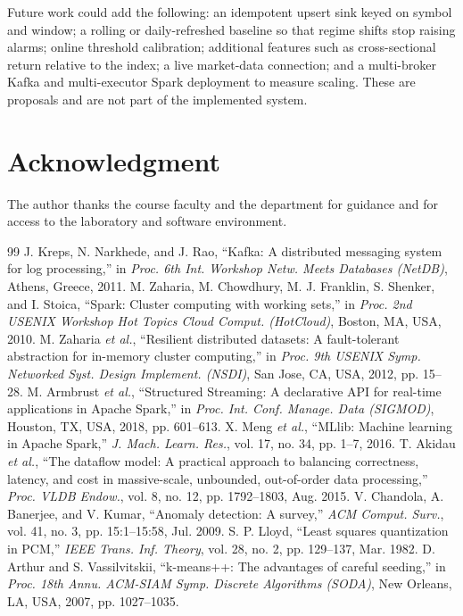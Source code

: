 \documentclass[conference]{IEEEtran}
\begin{document}
Future work could add the following: an idempotent upsert sink keyed on symbol and window; a rolling or daily-refreshed baseline so that regime shifts stop raising alarms; online threshold calibration; additional features such as cross-sectional return relative to the index; a live market-data connection; and a multi-broker Kafka and multi-executor Spark deployment to measure scaling. These are proposals and are not part of the implemented system.

\section*{Acknowledgment}
The author thanks the course faculty and the department for guidance and for access to the laboratory and software environment.

\begin{thebibliography}{99}
 J. Kreps, N. Narkhede, and J. Rao, ``Kafka: A distributed messaging system for log processing,'' in \emph{Proc. 6th Int. Workshop Netw. Meets Databases (NetDB)}, Athens, Greece, 2011.
 M. Zaharia, M. Chowdhury, M. J. Franklin, S. Shenker, and I. Stoica, ``Spark: Cluster computing with working sets,'' in \emph{Proc. 2nd USENIX Workshop Hot Topics Cloud Comput. (HotCloud)}, Boston, MA, USA, 2010.
 M. Zaharia \emph{et al.}, ``Resilient distributed datasets: A fault-tolerant abstraction for in-memory cluster computing,'' in \emph{Proc. 9th USENIX Symp. Networked Syst. Design Implement. (NSDI)}, San Jose, CA, USA, 2012, pp. 15--28.
 M. Armbrust \emph{et al.}, ``Structured Streaming: A declarative API for real-time applications in Apache Spark,'' in \emph{Proc. Int. Conf. Manage. Data (SIGMOD)}, Houston, TX, USA, 2018, pp. 601--613.
 X. Meng \emph{et al.}, ``MLlib: Machine learning in Apache Spark,'' \emph{J. Mach. Learn. Res.}, vol. 17, no. 34, pp. 1--7, 2016.
 T. Akidau \emph{et al.}, ``The dataflow model: A practical approach to balancing correctness, latency, and cost in massive-scale, unbounded, out-of-order data processing,'' \emph{Proc. VLDB Endow.}, vol. 8, no. 12, pp. 1792--1803, Aug. 2015.
 V. Chandola, A. Banerjee, and V. Kumar, ``Anomaly detection: A survey,'' \emph{ACM Comput. Surv.}, vol. 41, no. 3, pp. 15:1--15:58, Jul. 2009.
 S. P. Lloyd, ``Least squares quantization in PCM,'' \emph{IEEE Trans. Inf. Theory}, vol. 28, no. 2, pp. 129--137, Mar. 1982.
 D. Arthur and S. Vassilvitskii, ``k-means++: The advantages of careful seeding,'' in \emph{Proc. 18th Annu. ACM-SIAM Symp. Discrete Algorithms (SODA)}, New Orleans, LA, USA, 2007, pp. 1027--1035.

\end{thebibliography}
\end{document}
